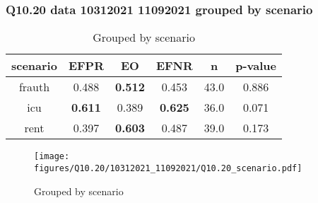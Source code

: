 \subsubsection{Q10.20 data 10312021 11092021 grouped by scenario}

\begin{comment}
               EFPR        EO      EFNR     n    pvalue
(frauth,)  0.488372  0.511628  0.453488  43.0  0.886426
(icu,)     0.611111  0.388889  0.625000  36.0  0.071389
(rent,)    0.397436  0.602564  0.487179  39.0  0.173035
\end{comment}

\begin{table}[h]
    \centering
    \begin{tabular}{|c|c|c|c|c|c|}
        \hline
        scenario & EFPR & EO & EFNR & n & p-value\\
        \hline
        frauth & 0.488 & \textbf{0.512} & 0.453 & 43.0 & 0.886\\
		icu & \textbf{0.611} & 0.389 & \textbf{0.625} & 36.0 & 0.071\\
		rent & 0.397 & \textbf{0.603} & 0.487 & 39.0 & 0.173\\
		
        \hline
    \end{tabular}
    \caption{Grouped by scenario}
    \label{tab:my_label}
\end{table}
\begin{figure}[h]
    \centering
    \texttt{[image: figures/Q10.20/10312021\_11092021/Q10.20\_scenario.pdf]}
    \caption{Grouped by scenario}
    \label{fig:my_label}
\end{figure}
